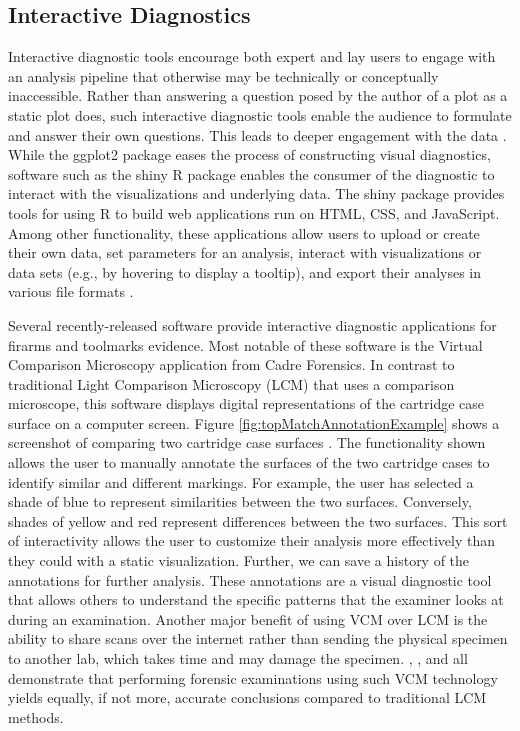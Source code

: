 \documentclass[11pt,]{isuthesis}
\begin{document}
\hypertarget{interactive-diagnostics}{%
\subsection{Interactive Diagnostics}\label{interactive-diagnostics}}

Interactive diagnostic tools encourage both expert and lay users to engage with an analysis pipeline that otherwise may be technically or conceptually inaccessible.
Rather than answering a question posed by the author of a plot as a static plot does, such interactive diagnostic tools enable the audience to formulate and answer their own questions.
This leads to deeper engagement with the data \citep{telea2014data}.
While the ggplot2 package eases the process of constructing visual diagnostics, software such as the shiny R package \citep{shiny} enables the consumer of the diagnostic to interact with the visualizations and underlying data.
The shiny package provides tools for using R to build web applications run on HTML, CSS, and JavaScript.
Among other functionality, these applications allow users to upload or create their own data, set parameters for an analysis, interact with visualizations or data sets (e.g., by hovering to display a tooltip), and export their analyses in various file formats \citep{Beeley2018-ci}.

Several recently-released software provide interactive diagnostic applications for firarms and toolmarks evidence.
Most notable of these software is the Virtual Comparison Microscopy application from Cadre Forensics\texttrademark.
In contrast to traditional Light Comparison Microscopy (LCM) that uses a comparison microscope, this software displays digital representations of the cartridge case surface on a computer screen.
Figure \ref{fig:topMatchAnnotationExample} shows a screenshot of comparing two cartridge case surfaces \citep{Chapnick2020}.
The functionality shown allows the user to manually annotate the surfaces of the two cartridge cases to identify similar and different markings.
For example, the user has selected a shade of blue to represent similarities between the two surfaces.
Conversely, shades of yellow and red represent differences between the two surfaces.
This sort of interactivity allows the user to customize their analysis more effectively than they could with a static visualization.
Further, we can save a history of the annotations for further analysis.
These annotations are a visual diagnostic tool that allows others to understand the specific patterns that the examiner looks at during an examination.
Another major benefit of using VCM over LCM is the ability to share scans over the internet rather than sending the physical specimen to another lab, which takes time and may damage the specimen.
\citet{Duez2017}, \citet{Chapnick2020}, and \citet{Knowles2021} all demonstrate that performing forensic examinations using such VCM technology yields equally, if not more, accurate conclusions compared to traditional LCM methods.
\end{document}
